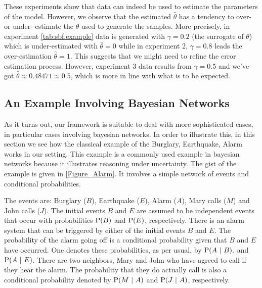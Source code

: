 \documentclass{llncs}
\newcommand{\at}[1]{\ensuremath{\!\del{#1}}}
\newcommand{\pr}[1]{\ensuremath{\mathrm{P}\at{#1}}}
\newcommand{\given}{\ensuremath{~\middle|~}}
\newcommand{\oldnote}[1]{\note{#1}}
\renewcommand{\note}[1]{
    \stepcounter{remark}%
    {\!\!\color{red}/}\footnotemark[\arabic{remark}]\!\!%
    \footnotetext[\arabic{remark}]{{\color{red}/}#1}
}
\begin{document}
These experiments show that data can indeed be used to estimate the parameters of the model. However, we observe that the estimated $\hat{\theta}$ has a tendency to  over- or under- estimate the $\theta$ used to generate the samples. More precisely, in experiment \ref{tab:sbf.example} data is generated with $\gamma = 0.2$ (the surrogate of $\theta$) which is under-estimated with $\hat{\theta} = 0$ while in experiment 2, $\gamma = 0.8$ leads the over-estimation $\hat{\theta} = 1$. This suggests that we might need to refine the error estimation process. However, experiment 3 data results from $\gamma = 0.5$ and we've got $\hat{\theta} \approx 0.48471 \approx 0.5$, which is more in line with what is to be expected.
%
%
%
\subsection{An Example Involving Bayesian Networks}\label{subsec:example.bayesian.networks}
%
%
%
As it turns out, our framework is suitable to deal with more sophisticated cases, in particular cases involving bayesian networks. In order to illustrate this, in this section we see how the classical example of the Burglary, Earthquake, Alarm \cite{Judea88} works in our setting. This example is a commonly used example in bayesian networks because it illustrates reasoning under uncertainty.  The gist of the example is given in \cref{Figure_Alarm}. It involves a simple network of events and conditional probabilities.

The events are: Burglary ($B$), Earthquake ($E$), Alarm ($A$), Mary calls ($M$) and John calls ($J$). The initial events $B$ and $E$ are assumed to be independent events that occur with probabilities $\pr{B}$ and $\pr{E}$, respectively. There is an alarm system that can be triggered by either of the initial events $B$ and $E$. The probability of the alarm going off is a conditional probability given that $B$ and $E$ have occurred. One denotes these probabilities, as per usual,  by $\pr{A \given B}$, and $\pr{A \given E}$. There are two neighbors, Mary and John who have agreed to call if they hear the alarm. The probability that they do actually call is also a conditional probability denoted by $\pr{M \given A}$ and $\pr{J \given A}$, respectively.
\end{document}
